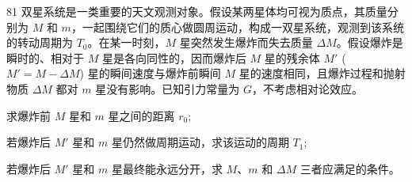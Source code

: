 \begin{problem}[第34届物理决赛][双星系统]{81}
    双星系统是一类重要的天文观测对象。假设某两星体均可视为质点，其质量分别为 $M$ 和 $m$，一起围绕它们的质心做圆周运动，构成一双星系统，观测到该系统的转动周期为 $T_{0}$。在某一时刻，$M$ 星突然发生爆炸而失去质量 $\Delta M$。假设爆炸是瞬时的、相对于 $M$ 星是各向同性的，因而爆炸后 $M$ 星的残余体 $M'$ ($M' = M - \Delta M$) 星的瞬间速度与爆炸前瞬间 $M$ 星的速度相同，且爆炸过程和抛射物质 $\Delta M$ 都对 $m$ 星没有影响。已知引力常量为 $G$，不考虑相对论效应。
    \begin{subproblem}
        \begin{subsubproblem}
            求爆炸前 $M$ 星和 $m$ 星之间的距离 $r_{0}$;
        \end{subsubproblem}
        \begin{subsubproblem}
            若爆炸后 $M'$ 星和 $m$ 星仍然做周期运动，求该运动的周期 $T_{1}$;
        \end{subsubproblem}
        \begin{subsubproblem}
            若爆炸后 $M'$ 星和 $m$ 星最终能永远分开，求 $M$、$m$ 和 $\Delta M$ 三者应满足的条件。
        \end{subsubproblem}
    \end{subproblem}
\end{problem}